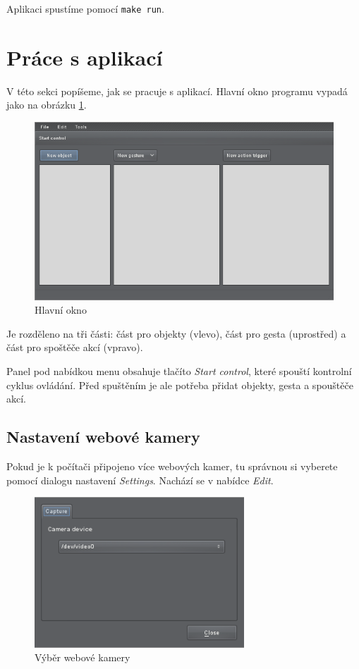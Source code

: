 Aplikaci spustíme pomocí \texttt{make run}.

\section{Práce s aplikací}
V této sekci popíšeme, jak se pracuje s aplikací. Hlavní okno programu vypadá
jako na obrázku \ref{fig:mainwindow}.

\begin{figure}[h]
\centering
\includegraphics[width=\textwidth]{mainwindow.png}
\caption{Hlavní okno}
\label{fig:mainwindow}
\end{figure}

Je rozděleno na tři části: část pro objekty (vlevo), část pro gesta
(uprostřed) a část pro spoštěče akcí (vpravo).

Panel pod nabídkou menu obsahuje tlačíto \emph{Start control}, které spouští
kontrolní cyklus ovládání. Před spuštěním je ale potřeba přidat objekty, gesta
a spouštěče akcí.

\subsection{Nastavení webové kamery}
Pokud je k počítači připojeno více webových kamer, tu správnou si vyberete
pomocí dialogu nastavení \emph{Settings}. Nachází se v nabídce \emph{Edit}.

\begin{figure}[h]
\centering
\includegraphics[width=0.7\textwidth]{settings.png}
\caption{Výběr webové kamery}
\label{fig:settings}
\end{figure}

